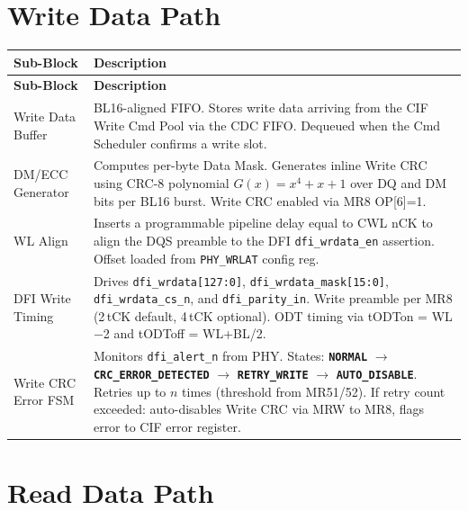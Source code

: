 \documentclass[11pt,a4paper]{article}
\newcommand{\reg}[1]{\textcolor{ddrpurple}{\texttt{#1}}}
\newcommand{\sig}[1]{\textcolor{ddrteal}{\texttt{#1}}}
\newcommand{\state}[1]{\textcolor{ddrblue}{\textbf{\texttt{#1}}}}
\begin{document}
\section{Write Data Path}

\begin{longtable}{L{3.6cm} L{10.9cm}}
\toprule
\textbf{Sub-Block} & \textbf{Description} \\
\midrule
\endfirsthead\toprule\textbf{Sub-Block}&\textbf{Description}\\\midrule\endhead
\bottomrule\endfoot

Write Data Buffer
  & BL16-aligned FIFO. Stores write data arriving from the CIF Write Cmd Pool
    via the CDC FIFO. Dequeued when the Cmd Scheduler confirms a write slot. \\
DM/ECC Generator
  & Computes per-byte Data Mask. Generates inline Write CRC using CRC-8
    polynomial $G(x)=x^4+x+1$ over DQ and DM bits per BL16 burst.
    Write CRC enabled via MR8 OP[6]=1. \\
WL Align
  & Inserts a programmable pipeline delay equal to CWL nCK to align the
    DQS preamble to the DFI \sig{dfi\_wrdata\_en} assertion.
    Offset loaded from \reg{PHY\_WRLAT} config reg. \\
DFI Write Timing
  & Drives \sig{dfi\_wrdata[127:0]}, \sig{dfi\_wrdata\_mask[15:0]},
    \sig{dfi\_wrdata\_cs\_n}, and \sig{dfi\_parity\_in}.
    Write preamble per MR8 (2\,tCK default, 4\,tCK optional).
    ODT timing via tODTon = WL$-$2 and tODToff = WL+BL/2. \\
Write CRC Error FSM
  & Monitors \sig{dfi\_alert\_n} from PHY. States:
    \state{NORMAL} $\to$ \state{CRC\_ERROR\_DETECTED} $\to$
    \state{RETRY\_WRITE} $\to$ \state{AUTO\_DISABLE}.
    Retries up to $n$ times (threshold from MR51/52).
    If retry count exceeded: auto-disables Write CRC via MRW to MR8,
    flags error to CIF error register. \\
\end{longtable}

\section{Read Data Path}
\end{document}
